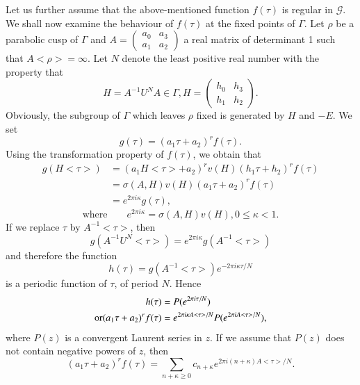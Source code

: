 Let us further assume that the above-mentioned function $f(\tau)$ is
regular in $\mathscr{G}$. We shall now examine the behaviour of
$f(\tau)$ at the fixed points of $\Gamma$. Let $\rho$ be a parabolic
cusp of $\Gamma$ and $A = \left(\begin{smallmatrix} a_0&a_3\\a_1 &
a_2 \end{smallmatrix}\right)$ a real matrix of determinant 1 such
that $A<\rho>=\infty$. Let $N$ denote the least positive real number
with the property that 
$$
H = A^{-1} U^N A \in \Gamma, H =
\left(\begin{smallmatrix} h_0 & h_3\\h_1 & h_2 \end{smallmatrix}
\right). 
$$
Obviously, the subgroup of $\Gamma$ which leaves $\rho$ fixed is
generated by $H$ and $-E$. We set 
$$
g(\tau) = (a_1 \tau+a_2)^r f(\tau).
$$
Using the transformation property of $f(\tau)$, we obtain that 
\begin{align*}
g(H<\tau>) & = (a_1H<\tau> + a_2)^r v(H) (h_1\tau+h_2)^r f(\tau)\\
& = \sigma(A,H) v(H) (a_1 \tau+a_2)^rf(\tau)\\
& = e^{2\pi i \kappa} g(\tau), 
\end{align*}
\begin{equation*}
\text{where} \qquad 
 e^{2\pi i \kappa} = \sigma(A,H)v(H), 0\leq \kappa <1.\tag{3}\label{c3:eq1:3}
\end{equation*}
If \pageoriginale we replace $\tau$ by $A^{-1}<\tau>$, then 
$$
g(A^{-1}U^N <\tau>) = e^{2\pi i \kappa} g(A^{-1} <\tau>)
$$
and therefore the function
$$
h(\tau) =g(A^{-1}<\tau>) e^{-2\pi i \kappa \tau/N}
$$
is a periodic function of $\tau$, of period $N$. Hence
\begin{align*}
h(\tau) & = P(e^{2\pi i \tau/N})\\
{\rm or } (a_1\tau+a_2)^r f(\tau) & = e^{2\pi i \kappa
  A<\tau>/N} P(e^{2\pi i A<\tau>/N}), 
\end{align*}
where $P(z)$ is a convergent Laurent series in $z$. If we assume that
$P(z)$ does not contain negative powers of $z$, then 
\begin{equation*}
(a_1\tau + a_2)^r f(\tau) = \sum_{n+\kappa \geq 0} c_{n+\kappa}
  e^{2\pi i (n+\kappa) A<\tau>/N}. \tag{4}\label{c3:eq1:4}
\end{equation*}

